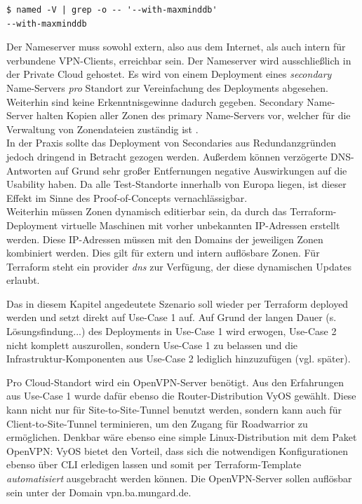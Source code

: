 \begin{lstlisting}[label=bind-mmdb-compiler-flag,caption=Das Ubuntu 20.04 Standardpaket wurde bereits mit dem Flag kompiliert.]
$ named -V | grep -o -- '--with-maxminddb'
--with-maxminddb
\end{lstlisting}

Der Nameserver muss sowohl extern, also aus dem Internet, als auch intern für verbundene VPN-Clients, erreichbar sein. Der Nameserver wird ausschließlich in der Private Cloud gehostet. Es wird von einem Deployment eines \textit{secondary} Name-Servers \textit{pro} Standort zur Vereinfachung des Deployments abgesehen. Weiterhin sind keine Erkenntnisgewinne dadurch gegeben. Secondary Name-Server halten Kopien aller Zonen des primary Name-Servers vor, welcher für die Verwaltung von Zonendateien zuständig ist \cite[S.517]{Fall2011}.\\

In der Praxis sollte das Deployment von \glqq Secondaries\grqq{} aus Redundanzgründen jedoch dringend in Betracht gezogen werden. Außerdem können \glqq verzögerte\grqq{} DNS-Antworten auf Grund sehr großer Entfernungen negative Auswirkungen auf die Usability haben. Da alle Test-Standorte innerhalb von Europa liegen, ist dieser Effekt im Sinne des Proof-of-Concepts vernachlässigbar.\\

Weiterhin müssen Zonen dynamisch editierbar sein, da durch das Terraform-Deployment virtuelle Maschinen mit vorher unbekannten IP-Adressen erstellt werden. Diese IP-Adressen müssen mit den Domains der jeweiligen Zonen kombiniert werden. Dies gilt für extern und intern auflösbare Zonen. Für Terraform steht ein provider \textit{dns} zur Verfügung, der diese dynamischen Updates erlaubt.

Das in diesem Kapitel angedeutete Szenario soll wieder per Terraform deployed werden und setzt direkt auf Use-Case 1 auf. Auf Grund der langen Dauer (s. Lösungsfindung...) des Deployments in Use-Case 1 wird erwogen, Use-Case 2 nicht \glqq komplett\grqq{} auszurollen, sondern Use-Case 1 zu belassen und die Infrastruktur-Komponenten aus Use-Case 2 lediglich hinzuzufügen (vgl. später).

Pro Cloud-Standort wird ein OpenVPN-Server benötigt. Aus den Erfahrungen aus Use-Case 1 wurde dafür ebenso die Router-Distribution VyOS gewählt. Diese kann nicht nur für Site-to-Site-Tunnel benutzt werden, sondern kann auch für Client-to-Site-Tunnel terminieren, um den Zugang für Roadwarrior zu ermöglichen. Denkbar wäre ebenso eine simple Linux-Distribution mit dem Paket OpenVPN: VyOS bietet den Vorteil, dass sich die notwendigen Konfigurationen ebenso über CLI erledigen lassen und somit per Terraform-Template \textit{automatisiert} ausgebracht werden können. Die OpenVPN-Server sollen auflösbar sein unter der Domain vpn.ba.mungard.de.\\

